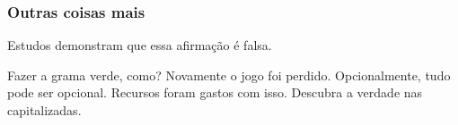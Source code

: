 \documentclass[embeddedlogo]{ufsc-thesis-rn46-2019}
\begin{document}
\subsubsection{Outras coisas mais}
\label{sec:yet-more}
Estudos demonstram que essa afirmação é falsa.

\label{sec:yet-another}
Fazer a grama verde, como? Novamente o jogo foi perdido. Opcionalmente, tudo pode ser opcional. Recursos foram gastos com isso. Descubra a verdade nas capitalizadas.



\postextual

\end{document}
